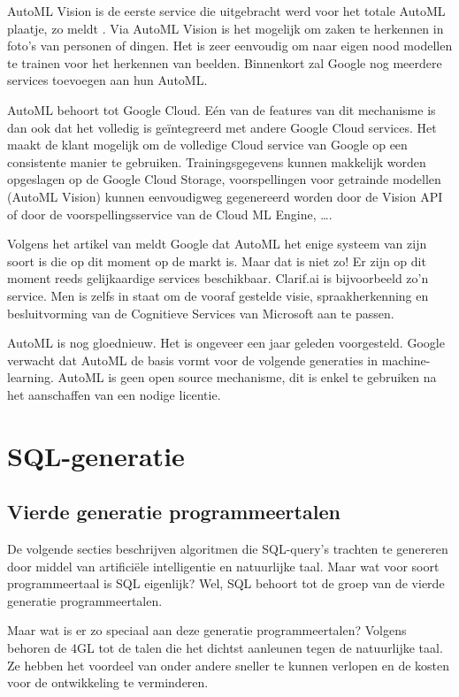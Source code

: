 AutoML Vision is de eerste service die uitgebracht werd voor het totale AutoML plaatje, zo meldt \textcite{automl}. Via AutoML Vision is het mogelijk om zaken te herkennen in foto’s van personen of dingen. Het is zeer eenvoudig om naar eigen nood modellen te trainen voor het herkennen van beelden. Binnenkort zal Google nog meerdere services toevoegen aan hun AutoML.

AutoML behoort tot Google Cloud. Eén van de features van dit mechanisme is dan ook dat het volledig is geïntegreerd met andere Google Cloud services. Het maakt de klant mogelijk om de volledige Cloud service van Google op een consistente manier te gebruiken. Trainingsgegevens kunnen makkelijk worden opgeslagen op de Google Cloud Storage, voorspellingen voor getrainde modellen (AutoML Vision) kunnen eenvoudigweg gegenereerd worden door de Vision API of door de voorspellingsservice van de Cloud ML Engine, \dots.

Volgens het artikel van \textcite{tc} meldt Google dat AutoML het enige systeem van zijn soort is die op dit moment op de markt is. Maar dat is niet zo! Er zijn op dit moment reeds gelijkaardige services beschikbaar. Clarif.ai is bijvoorbeeld zo’n service. Men is zelfs in staat om de vooraf gestelde visie, spraakherkenning en besluitvorming van de Cognitieve Services van Microsoft aan te passen.
 
AutoML is nog gloednieuw. Het is ongeveer een jaar geleden voorgesteld. Google verwacht dat AutoML de basis vormt voor de volgende generaties in machine-learning. AutoML is geen open source mechanisme, dit is enkel te gebruiken na het aanschaffen van een nodige licentie.

\section{SQL-generatie}

\subsection{Vierde generatie programmeertalen}

De volgende secties beschrijven algoritmen die SQL-query's trachten te genereren door middel van artificiële intelligentie en natuurlijke taal. Maar wat voor soort programmeertaal is SQL eigenlijk? Wel, SQL behoort tot de groep van de vierde generatie programmeertalen.

Maar wat is er zo speciaal aan deze generatie programmeertalen? Volgens \textcite{fourthgenpl} behoren de 4GL tot de talen die het dichtst aanleunen tegen de natuurlijke taal. Ze hebben het voordeel van onder andere sneller te kunnen verlopen en de kosten voor de ontwikkeling te verminderen.

